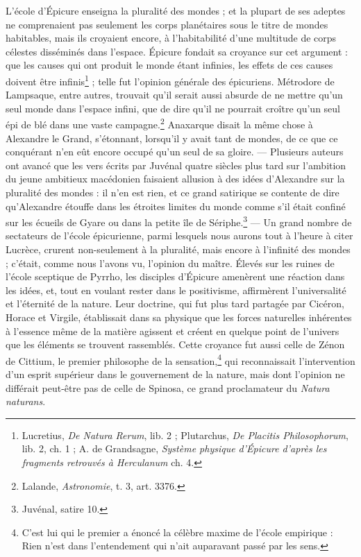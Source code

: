 \documentclass[a4paper, 11pt, oneside, landscape]{article}
\begin{document}
L'école d'Épicure enseigna la pluralité des mondes ; et la plupart de ses adeptes ne comprenaient pas seulement les corps planétaires sous le titre de mondes habitables, mais ils croyaient encore, à l'habitabilité d'une multitude de corps célestes disséminés dans l'espace. Épicure fondait sa croyance sur cet argument : que les causes qui ont produit le monde étant infinies, les effets de ces causes doivent être infinis\footnote{Lucretius, \emph{De Natura Rerum}, lib. 2 ; Plutarchus, \emph{De Placitis Philosophorum}, lib. 2, ch. 1 ; A. de Grandsagne, \emph{Système physique d'Épicure d'après les fragments retrouvés à Herculanum} ch. 4.} ; telle fut l'opinion générale des épicuriens. Métrodore de Lampsaque, entre autres, trouvait qu'il serait aussi absurde de ne mettre qu'un seul monde dans l'espace infini, que de dire qu'il ne pourrait croître qu'un seul épi de blé dans une vaste campagne.\footnote{Lalande, \emph{Astronomie}, t. 3, art. 3376.} Anaxarque disait la même chose à Alexandre le Grand, s'étonnant, lorsqu'il y avait tant de mondes, de ce que ce conquérant n'en eût encore occupé qu'un seul de sa gloire. --- Plusieurs auteurs ont avancé que les vers écrits par Juvénal quatre siècles plus tard sur l'ambition du jeune ambitieux macédonien faisaient allusion à des idées d'Alexandre sur la pluralité des mondes : il n'en est rien, et ce grand satirique se contente de dire qu'Alexandre étouffe dans les étroites limites du monde comme s'il était confiné sur les écueils de Gyare ou dans la petite île de Sériphe.\footnote{Juvénal, satire 10.} --- Un grand nombre de sectateurs de l'école épicurienne, parmi lesquels nous aurons tout à l'heure à citer Lucrèce, crurent non-seulement à la pluralité, mais encore à l'infinité des mondes ; c'était, comme nous l'avons vu, l'opinion du maître. Élevés sur les ruines de l'école sceptique de Pyrrho, les disciples d'Épicure amenèrent une réaction dans les idées, et, tout en voulant rester dans le positivisme, affirmèrent l'universalité et l'éternité de la nature. Leur doctrine, qui fut plus tard partagée par Cicéron, Horace et Virgile, établissait dans sa physique que les forces naturelles inhérentes à l'essence même de la matière agissent et créent en quelque point de l'univers que les éléments se trouvent rassemblés. Cette croyance fut aussi celle de Zénon de Cittium, le premier philosophe de la sensation,\footnote{C'est lui qui le premier a énoncé la célèbre maxime de l'école empirique : Rien n'est dans l'entendement qui n'ait auparavant passé par les sens.} qui reconnaissait l'intervention d'un esprit supérieur dans le gouvernement de la nature, mais dont l'opinion ne différait peut-être pas de celle de Spinosa, ce grand proclamateur du \emph{Natura naturans}.
\end{document}
